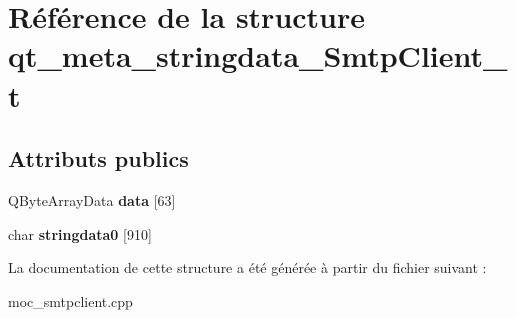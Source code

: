 \hypertarget{structqt__meta__stringdata__SmtpClient__t}{}\section{Référence de la structure qt\+\_\+meta\+\_\+stringdata\+\_\+\+Smtp\+Client\+\_\+t}
\label{structqt__meta__stringdata__SmtpClient__t}
\subsection*{Attributs publics}
\begin{DoxyCompactItemize}
\item 
Q\+Byte\+Array\+Data {\bfseries data} \mbox{[}63\mbox{]}\hypertarget{structqt__meta__stringdata__SmtpClient__t_a5747f51a7f47628bab58312b0ae0b6d1}{}\label{structqt__meta__stringdata__SmtpClient__t_a5747f51a7f47628bab58312b0ae0b6d1}

\item 
char {\bfseries stringdata0} \mbox{[}910\mbox{]}\hypertarget{structqt__meta__stringdata__SmtpClient__t_a66a451959e60f4b605abbd3c2e3600f9}{}\label{structqt__meta__stringdata__SmtpClient__t_a66a451959e60f4b605abbd3c2e3600f9}

\end{DoxyCompactItemize}


La documentation de cette structure a été générée à partir du fichier suivant \+:\begin{DoxyCompactItemize}
\item 
moc\+\_\+smtpclient.\+cpp\end{DoxyCompactItemize}
